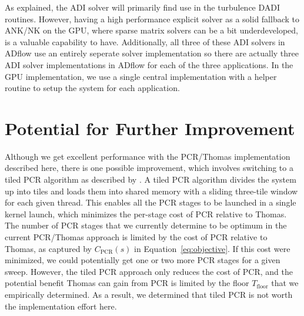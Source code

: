 \documentclass[noinfobox]{mdolab-article}
\newcommand{\nstages}{s}                        %
\newcommand{\Cpcr}{C_{\mathrm{PCR}}}            %
\newcommand{\Tfloor}{T_{\mathrm{floor}}}        %
\begin{document}
As explained, the ADI solver will primarily find use in the turbulence DADI routines.
However, having a high performance explicit solver as a solid fallback to ANK/NK on the GPU, where sparse matrix solvers can be a bit underdeveloped, is a valuable capability to have.
Additionally, all three of these ADI solvers in ADflow use an entirely seperate solver implementation so there are actually three ADI solver implementations in ADflow for each of the three applications.
In the GPU implementation, we use a single central implementation with a helper routine to setup the system for each application.


\section{Potential for Further Improvement}

Although we get excellent performance with the PCR/Thomas implementation described here, there is one possible improvement, which involves switching to a tiled PCR algorithm as described by \citet{Kim2011}.
A tiled PCR algorithm divides the system up into tiles and loads them into shared memory with a sliding three-tile window for each given thread.
This enables all the PCR stages to be launched in a single kernel launch, which minimizes the per-stage cost of PCR relative to Thomas.
The number of PCR stages that we currently determine to be optimum in the current PCR/Thomas approach is limited by the cost of PCR relative to Thomas, as captured by $\Cpcr(\nstages)$ in Equation~\eqref{eq:objective}.
If this cost were minimized, we could potentially get one or two more PCR stages for a given sweep.
However, the tiled PCR approach only reduces the cost of PCR, and the potential benefit Thomas can gain from PCR is limited by the floor $\Tfloor$ that we empirically determined.
As a result, we determined that tiled PCR is not worth the implementation effort here.



\end{document}
